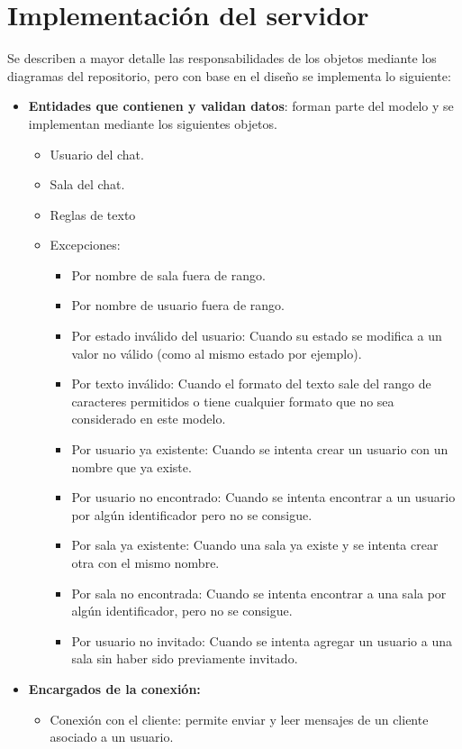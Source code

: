 \section{Implementación del servidor}

Se describen a mayor detalle las responsabilidades de los objetos mediante los diagramas del repositorio, pero con base en el diseño se implementa lo siguiente:
\begin{itemize}
	\item \textbf{Entidades que contienen y validan datos}: forman parte del modelo y se implementan mediante los siguientes objetos.
	\begin{itemize}
		\item Usuario del chat.
		\item Sala del chat.
		\item Reglas de texto
		\item Excepciones:
		\begin{itemize}
			\item Por nombre de sala fuera de rango.
			\item Por nombre de usuario fuera de rango.
			\item Por estado inválido del usuario: Cuando su estado se modifica a un valor no válido (como al mismo estado por ejemplo).
			\item Por texto inválido: Cuando el formato del texto sale del rango de caracteres permitidos o tiene cualquier formato que no sea considerado en este modelo.
			\item Por usuario ya existente: Cuando se intenta crear un usuario con un nombre que ya existe.
			\item Por usuario no encontrado: Cuando se intenta encontrar a un usuario por algún identificador pero no se consigue.
			\item Por sala ya existente: Cuando una sala ya existe y se intenta crear otra con el mismo nombre.
			\item Por sala no encontrada: Cuando se intenta encontrar a una sala por algún identificador, pero no se consigue.
			\item Por usuario no invitado: Cuando se intenta agregar un usuario a una sala sin haber sido previamente invitado.
		\end{itemize}
	\end{itemize}
	\item \textbf{Encargados de la conexión:}
	\begin{itemize}
		\item Conexión con el cliente: permite enviar y leer mensajes de un cliente asociado a un usuario.

\end{itemize}
\end{itemize}
